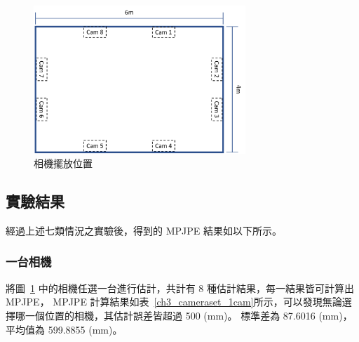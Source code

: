\begin{figure}[!ht]
   \centering
   \includegraphics[width=8cm]{figure/ch3_fig_cameraset_totalcap.png}
    \caption[相機擺放位置]{相機擺放位置}
    \label{ch3_fig_cameraset_totalcap}
\end{figure}

\subsection{實驗結果}
經過上述七類情況之實驗後，得到的 MPJPE 結果如以下所示。

\subsubsection{一台相機}
將圖~\ref{ch3_fig_cameraset_totalcap} 中的相機任選一台進行估計，共計有 8 種估計結果，每一結果皆可計算出 MPJPE，
MPJPE 計算結果如表~\ref{ch3_cameraset_1cam}所示，可以發現無論選擇哪一個位置的相機，其估計誤差皆超過 500 (mm)。
標準差為 87.6016 (mm)，平均值為 599.8855 (mm)。
\begin{table}[!ht]
   \caption[一台相機組合與其估計結果誤差]{一台相機組合與其估計結果誤差}
   \centering
   \label{ch3_cameraset_1cam}
   \setlength{\tabcolsep}{3pt}
   \renewcommand\arraystretch{1.5}
\end{table}
\clearpage

